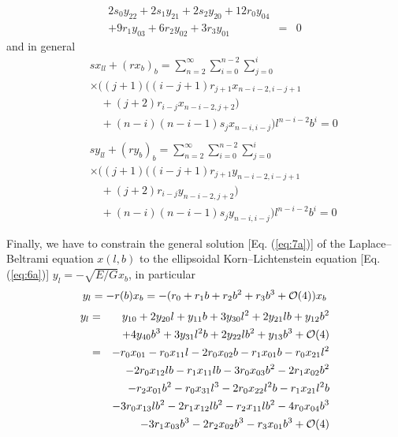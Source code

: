 \documentclass[jog]{svjour}
\begin{document}
\begin{corollary}
\begin{equation}
\begin{array}{lcr}
2s_0y_{22}+2s_1y_{21}+2s_2y_{20}+12r_0y_{04} & &\\
+9r_1y_{03}+6r_2y_{02}+3r_3y_{01} &= &0
\end{array}
\label{eq:21}
\end{equation}
and in general
\begin{eqnarray*}
&&sx_{ll}+(rx_b)_b =\sum_{n=2}^\infty\sum_{i=0}^{n-2}\sum_{j=0}^{i}\\
&&\times\Big( (j+1) \big( (i-j+1)r_{j+1}x_{n-i-2,i-j+1}\\
&&\quad+(j+2)r_{i-j}x_{n-i-2,j+2} \big)\\
&&\quad+ (n-i)(n-i-1)s_{j}x_{n-i,i-j} \Big) l^{n-i-2}b^{i}=0\\
&&\\
&&sy_{ll}+(ry_b)_b =\sum_{n=2}^\infty\sum_{i=0}^{n-2}\sum_{j=0}^{i}\\
&&\times\Big( (j+1) \big( (i-j+1)r_{j+1}y_{n-i-2,i-j+1}\\
&&\quad+(j+2)r_{i-j}y_{n-i-2,j+2} \big)\\
&&\quad+ (n-i)(n-i-1)s_{j}y_{n-i,i-j} \Big) l^{n-i-2}b^{i}=0
\end{eqnarray*}

Finally, we have to constrain the general solution [Eq. (\ref{eq:7a})]
of the Laplace--Beltrami equation $x(l,b)$ to the ellipsoidal
Korn--Lichtenstein equation [Eq. (\ref{eq:6a})] $y_l=-\sqrt{E/G}x_b$, in
particular
\begin{eqnarray}
y_l=-r(b)x_b=-(r_0+r_1b+r_2b^2+r_3b^3+{\cal O}(4))x_b
\label{eq:22}
\end{eqnarray}
\begin{eqnarray}
y_l &= &y_{10}+2y_{20}l+y_{11}b+3y_{30}l^2+2y_{21}lb+y_{12}b^2\label{eq:23}\\
& &+4y_{40}b^3+3y_{31}l^2b+2y_{22}lb^2+y_{13}b^3+{\cal O}(4)\nonumber\\
&= &-r_0x_{01}-r_0x_{11}l-2r_0x_{02}b-r_1x_{01}b-r_0x_{21}l^2\nonumber\\
& &-2r_0x_{12}lb-r_1x_{11}lb-3r_0x_{03}b^2-2r_1x_{02}b^2\nonumber\\
& &-r_2x_{01}b^2-r_0x_{31}l^3-2r_0x_{22}l^2b-r_1x_{21}l^2b\nonumber\\
& &-3r_0x_{13}lb^2-2r_1x_{12}lb^2-r_2x_{11}lb^2-4r_0x_{04}b^3\nonumber\\
& &-3r_1x_{03}b^3-2r_2x_{02}b^3-r_3x_{01}b^3+{\cal O}(4)\nonumber
\end{eqnarray}


\end{corollary}
\end{document}
